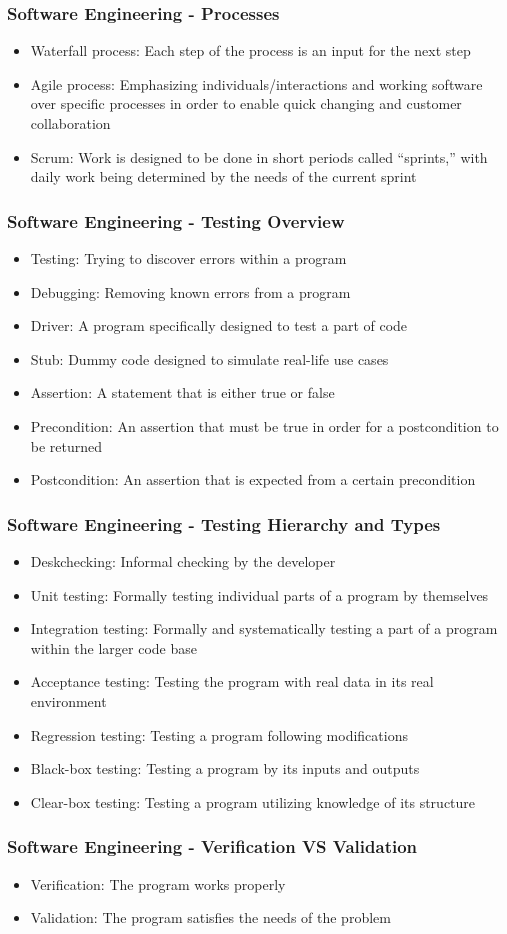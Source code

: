 \begin{frame}\frametitle{Software Engineering - Processes}
\begin{itemize}
\item Waterfall process: Each step of the process is an input for the next step
\item Agile process: Emphasizing individuals/interactions and working software over specific processes in order to enable quick changing and customer collaboration
\item Scrum: Work is designed to be done in short periods called ``sprints,'' with daily work being determined by the needs of the current sprint
\end{itemize}
\end{frame}

\begin{frame}\frametitle{Software Engineering - Testing Overview}
\begin{itemize}
\item Testing: Trying to discover errors within a program
\item Debugging: Removing known errors from a program
\item Driver: A program specifically designed to test a part of code
\item Stub: Dummy code designed to simulate real-life use cases
\item Assertion: A statement that is either true or false
\item Precondition: An assertion that must be true in order for a postcondition to be returned
\item Postcondition: An assertion that is expected from a certain precondition
\end{itemize}
\end{frame}

\begin{frame}\frametitle{Software Engineering - Testing Hierarchy and Types}
\begin{itemize}
\item Deskchecking: Informal checking by the developer
\item Unit testing: Formally testing individual parts of a program by themselves
\item Integration testing: Formally and systematically testing a part of a program within the larger code base
\item Acceptance testing: Testing the program with real data in its real environment
\item Regression testing: Testing a program following modifications
\item Black-box testing: Testing a program by its inputs and outputs
\item Clear-box testing: Testing a program utilizing knowledge of its structure
\end{itemize}
\end{frame}

\begin{frame}\frametitle{Software Engineering - Verification VS Validation}
\begin{itemize}
\item Verification: The program works properly
\item Validation: The program satisfies the needs of the problem
\end{itemize}
\end{frame}

